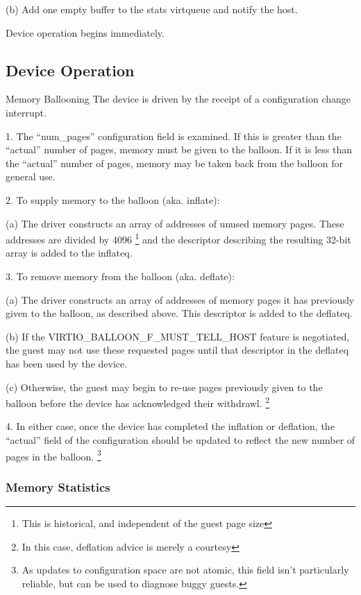   (b) Add one empty buffer to the stats virtqueue and notify the
    host.

Device operation begins immediately.

\subsection{Device Operation}\label{sec:Device Types / Memory Balloon Device / Device Operation}

Memory Ballooning The device is driven by the receipt of a
configuration change interrupt.

1. The “num_pages” configuration field is examined. If this is
  greater than the “actual” number of pages, memory must be given
  to the balloon. If it is less than the “actual” number of
  pages, memory may be taken back from the balloon for general
  use.

2. To supply memory to the balloon (aka. inflate):

  (a) The driver constructs an array of addresses of unused memory
    pages. These addresses are divided by 4096
\footnote{This is historical, and independent of the guest page size
} and the descriptor
    describing the resulting 32-bit array is added to the inflateq.

3. To remove memory from the balloon (aka. deflate):

  (a) The driver constructs an array of addresses of memory pages
    it has previously given to the balloon, as described above.
    This descriptor is added to the deflateq.

  (b) If the VIRTIO_BALLOON_F_MUST_TELL_HOST feature is negotiated, the
    guest may not use these requested pages until that descriptor
    in the deflateq has been used by the device.

  (c) Otherwise, the guest may begin to re-use pages previously
    given to the balloon before the device has acknowledged their
    withdrawl. 
\footnote{In this case, deflation advice is merely a courtesy
}

4. In either case, once the device has completed the inflation or
  deflation, the “actual” field of the configuration should be
  updated to reflect the new number of pages in the balloon.
\footnote{As updates to configuration space are not atomic, this field
isn't particularly reliable, but can be used to diagnose buggy guests.
}

\subsubsection{Memory Statistics}\label{sec:Device Types / Memory Balloon Device / Device Operation / Memory Statistics}

